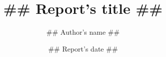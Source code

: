 \documentclass[a4paper]{Informe_style}
\begin{document}
\title{## Report's title ##}
\author{## Author's name ##}
\date{## Report's date ##}

\maketitle

\setcounter{page}{1}



%
%
\end{document}
